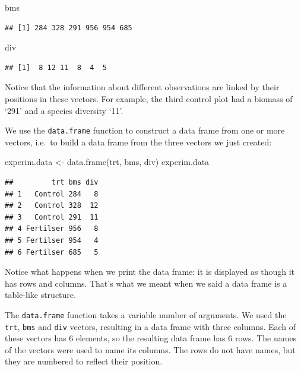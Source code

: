 \documentclass[
]{book}
\newenvironment{Shaded}{\begin{snugshade}}{\end{snugshade}}
\newcommand{\FunctionTok}[1]{\textcolor[rgb]{0.00,0.00,0.00}{#1}}
\newcommand{\NormalTok}[1]{#1}
\newcommand{\OtherTok}[1]{\textcolor[rgb]{0.56,0.35,0.01}{#1}}
\begin{document}
\begin{Shaded}
\begin{Highlighting}[]
\NormalTok{bms}
\end{Highlighting}
\end{Shaded}

\begin{verbatim}
## [1] 284 328 291 956 954 685
\end{verbatim}

\begin{Shaded}
\begin{Highlighting}[]
\NormalTok{div}
\end{Highlighting}
\end{Shaded}

\begin{verbatim}
## [1]  8 12 11  8  4  5
\end{verbatim}

Notice that the information about different observations are linked by their positions in these vectors. For example, the third control plot had a biomass of `291' and a species diversity `11'.

We use the \texttt{data.frame} function to construct a data frame from one or more vectors, i.e.~to build a data frame from the three vectors we just created:

\begin{Shaded}
\begin{Highlighting}[]
\NormalTok{experim.data }\OtherTok{\textless{}{-}} \FunctionTok{data.frame}\NormalTok{(trt, bms, div)}
\NormalTok{experim.data}
\end{Highlighting}
\end{Shaded}

\begin{verbatim}
##         trt bms div
## 1   Control 284   8
## 2   Control 328  12
## 3   Control 291  11
## 4 Fertilser 956   8
## 5 Fertilser 954   4
## 6 Fertilser 685   5
\end{verbatim}

Notice what happens when we print the data frame: it is displayed as though it has rows and columns. That's what we meant when we said a data frame is a table-like structure.

The \texttt{data.frame} function takes a variable number of arguments. We used the \texttt{trt}, \texttt{bms} and \texttt{div} vectors, resulting in a data frame with three columns. Each of these vectors has 6 elements, so the resulting data frame has 6 rows. The names of the vectors were used to name its columns. The rows do not have names, but they are numbered to reflect their position.
\end{document}
